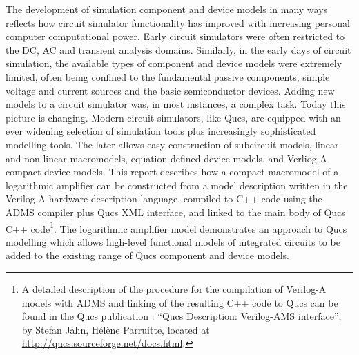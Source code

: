 %
%
%
%

\renewcommand{\thesubfigure}{\thefigure(\alph{subfigure})}
\makeatletter
  \renewcommand{\@thesubfigure}{\thesubfigure:\space}
  \renewcommand{\p@subfigure}{}
\makeatother

\renewcommand{\thesubtable}{\thetable(\alph{subtable})}
\makeatletter
  \renewcommand{\@thesubtable}{\thesubtable:\space}
  \renewcommand{\p@subtable}{}
\makeatother


The development of simulation component and device models in many ways
reflects how circuit simulator functionality has improved with
increasing personal computer computational power. Early circuit
simulators were often restricted to the DC, AC and transient analysis
domains.  Similarly, in the early days of circuit simulation, the
available types of component and device models were extremely limited,
often being confined to the fundamental passive components, simple
voltage and current sources and the basic semiconductor devices.
Adding new models to a circuit simulator was, in most instances, a
complex task. Today this picture is changing. Modern circuit
simulators, like Qucs, are equipped with an ever widening selection of
simulation tools plus increasingly sophisticated modelling tools. The
later allows easy construction of subcircuit models, linear and
non-linear macromodels, equation defined device models, and Verliog-A
compact device models.  This report describes how a compact macromodel
of a logarithmic amplifier can be constructed from a model description
written in the Verilog-A hardware description language, compiled to
C++ code using the ADMS compiler plus Qucs XML interface, and linked
to the main body of Qucs C++ code\footnote{A detailed description of
the procedure for the compilation of Verilog-A models with ADMS and
linking of the resulting C++ code to Qucs can be found in the Qucs
publication : ``Qucs Description: Verilog-AMS interface'', by Stefan
Jahn, H\'{e}l\`{e}ne Parruitte, located at
\url{http://qucs.sourceforge.net/docs.html}. }. The logarithmic
amplifier model demonstrates an approach to Qucs modelling which
allows high-level functional models of integrated circuits to be added
to the existing range of Qucs component and device models.

